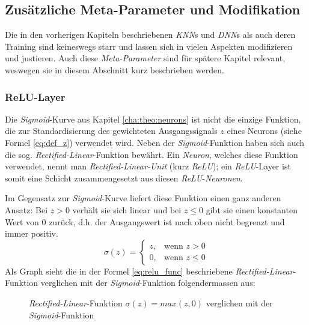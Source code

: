 \subsection{Zusätzliche Meta-Parameter und Modifikation}
Die in den vorherigen Kapiteln beschriebenen \textit{KNN}s und \textit{DNN}s als auch deren Training sind keineswegs starr und lassen sich in vielen Aspekten modifizieren und justieren. Auch diese \textit{Meta-Parameter} sind für spätere Kapitel relevant, weswegen sie in diesem Abschnitt kurz beschrieben werden. 

\subsubsection{ReLU-Layer}\label{cha:theo:relu}
Die \textit{Sigmoid}-Kurve aus Kapitel \ref{cha:theo:neurons} ist nicht die einzige Funktion, die zur Standardisierung des gewichteten Ausgangssignals $z$ eines Neurons (siehe Formel \ref{eq:def_z}) verwendet wird. Neben der \textit{Sigmoid}-Funktion haben sich auch die sog. \textit{Rectified-Linear}-Funktion bewährt. Ein \textit{Neuron}, welches diese Funktion verwendet, nennt man \textit{Rectified-Linear-Unit} (kurz \textit{ReLU}); ein \textit{ReLU}-Layer ist somit eine Schicht zusammengesetzt aus diesen \textit{ReLU}-\textit{Neuronen}.

Im Gegensatz zur \textit{Sigmoid}-Kurve liefert diese Funktion einen ganz anderen Ansatz: Bei $z > 0$ verhält sie sich linear und bei $z \leq 0$ gibt sie einen konstanten Wert von 0 zurück, d.h. der Ausgangswert ist nach oben nicht begrenzt und immer positiv.
\begin{equation}\label{eq:relu_func}
	\sigma(z) = \begin{cases} z, & \mbox{wenn } z > 0 \\ 0, & \mbox{wenn } z \leq 0 \end{cases}
\end{equation}
Als Graph sieht die in der Formel \ref{eq:relu_func} beschriebene \textit{Rectified-Linear}-Funktion verglichen mit der \textit{Sigmoid}-Funktion folgendermassen aus:

\begin{figure}[h]
	\centering
	\caption[\textit{Rectified-Linear}-Funktion]{\textit{Rectified-Linear}-Funktion $\sigma(z) = max(z,0)$ verglichen mit der \textit{Sigmoid}-Funktion}
	\label{plt:rect_lin}
\end{figure}

